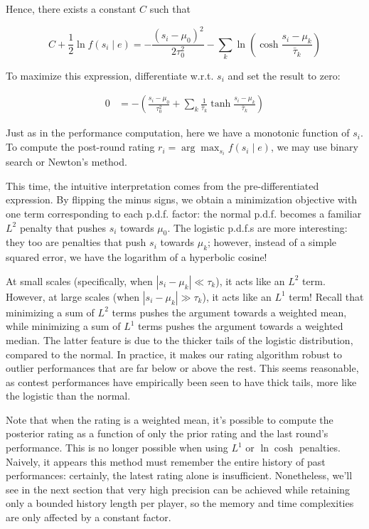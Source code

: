 \documentclass{article}
\begin{document}
Hence, there exists a constant $C$ such that

\[C + \frac 1 2 \ln f(s_i \mid e) = -\frac{(s_i-\mu_0)^2}{2\tau_0^2} - \sum_k \ln\left( \cosh\frac{s_i-\mu_k}{\bar\tau_k} \right)\]

To maximize this expression, differentiate w.r.t. $s_i$ and set the result to zero:

\begin{align*}
0 &= -\left( \frac{s_i-\mu_0}{\tau_0^2} + \sum_k \frac{1}{\bar\tau_k} \tanh \frac {s_i-\mu_k} {\bar\tau_k} \right)
\end{align*}

Just as in the performance computation, here we have a monotonic function of $s_i$. To compute the post-round rating $r_i = \arg\max_{s_i} f(s_i \mid e)$, we may use binary search or Newton's method.

This time, the intuitive interpretation comes from the pre-differentiated expression. By flipping the minus signs, we obtain a minimization objective with one term corresponding to each p.d.f. factor: the normal p.d.f. becomes a familiar $L^2$ penalty that pushes $s_i$ towards $\mu_0$. The logistic p.d.f.s are more interesting: they too are penalties that push $s_i$ towards $\mu_k$; however, instead of a simple squared error, we have the logarithm of a hyperbolic cosine!

At small scales (specifically, when $|s_i-\mu_k| \ll \tau_k$), it acts like an $L^2$ term. However, at large scales (when $|s_i-\mu_k| \gg \tau_k$), it acts like an $L^1$ term! Recall that minimizing a sum of $L^2$ terms pushes the argument towards a weighted mean, while minimizing a sum of $L^1$ terms pushes the argument towards a weighted median. The latter feature is due to the thicker tails of the logistic distribution, compared to the normal. In practice, it makes our rating algorithm robust to outlier performances that are far below or above the rest. This seems reasonable, as contest performances have empirically been seen to have thick tails, more like the logistic than the normal.

Note that when the rating is a weighted mean, it's possible to compute the posterior rating as a function of only the prior rating and the last round's performance. This is no longer possible when using $L^1$ or $\ln\cosh$ penalties. Naively, it appears this method must remember the entire history of past performances: certainly, the latest rating alone is insufficient. Nonetheless, we'll see in the next section that very high precision can be achieved while retaining only a bounded history length per player, so the memory and time complexities are only affected by a constant factor.
\end{document}
